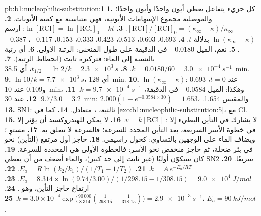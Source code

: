 \begin{solution}{pb:b1:nucleophilic-substitution:1}
\textbf{1.} كل جزيء يتفاعل يعطي أيون  واحدًا وأيون  واحدًا؛
والموصلية مجموع الإسهامات الأيونية، فهي متناسبة مع
كمية الأيونات.
\textbf{2.} $[\mathrm{RCl}]/[\mathrm{RCl}]_0 = (\kappa_\infty -
\kappa)/\kappa_\infty$.
\textbf{3.} $\ln[\mathrm{RCl}] = \ln[\mathrm{RCl}]_0 - kt$: ارسم
$\ln(\kappa_\infty - \kappa)$ بدلالة $t$.
\textbf{4.} 0.693، 0.603، 0.513، 0.423، 0.333، 0.153، $-0.117$، $-0.387$.
\textbf{5.} نعم، الميل $-0.0180$ في الدقيقة على طول المنحنى: الرتبة الأولى.
\textbf{6.} أي رتبة بالنسبة إلى الماء: فتركيزه ثابت
(انحطاط الرتبة).
\textbf{7.} $k = 0.0180/60 = \qty{3.0e-4}{s^{-1}}$.
\textbf{8.} $t_{1/2} = \ln 2/k = \qty{2.3e3}{s}$، أي \qty{38.5}{min}.
\textbf{9.} $\ln 10/k = \qty{7.7e3}{s}$، أي \qty{128}{min}.
\textbf{10.} $\ln(\kappa_\infty - \kappa)$: 0.693 عند $t = 0$، و0.109 عند
\qty{10}{min}، وهكذا: الميل $-0.0584$ في الدقيقة، $k = \qty{9.7e-4}{s^{-1}}$.
\textbf{11.} $9.7/3.0 = 3.2$.
\textbf{12.} عند \qty{30}{min}: $2.000(1 - e^{-0.0584 \times 30}) = 1.653$،
والمقيس 1.654.
\textbf{13.} SN1:  ثالثية، ،  متعادل.
\textbf{14.} كما في \cref{exo:b1:nucleophilic-substitution:5}، مع Cl.
\textbf{15.} لا يشارك في التأين البطيء إلا : $v =
k[\mathrm{RCl}]$.
\textbf{16.} لا يمكن للهيدروكسيد أن يؤثر إلا في خطوة الأسر السريعة، بعد
التأين المحدد للسرعة؛ فالسرعة لا تتعلق به.
\textbf{17.}  مستوٍ ؛ ويضاف الماء على الوجهين
بالتساوي: كحول راسيمي.
\textbf{18.} حاجز أول مرتفع (التأين) نحو  في
بئر ضحلة، ثم حاجز منخفض نحو الأسر: فالخطوة الأولى هي
المحددة للسرعة.
\textbf{19.} كان سيكوّن  أوليًا (غير ثابت إلى حد كبير)، والماء
 أضعف من أن يعطي SN2 سريعًا.
\textbf{20.} $k = A\,e^{-E_a/RT}$.
\textbf{21.} $E_a = R\ln(k_2/k_1)/(1/T_1 - 1/T_2)$.
\textbf{22.} $E_a = 8.314 \times \ln(9.74/3.00)/(1/298.15 - 1/308.15) =
\qty{9.0e4}{J/mol}$.
\textbf{23.} ارتفاع حاجز التأين، وهو .
\textbf{24.} $k = 3.0 \times 10^{-4} \exp\bigl(\frac{90\,000}{8.314}
(\frac{1}{298.15} - \frac{1}{318.15})\bigr) = \qty{2.9e-3}{s^{-1}}$.
\textbf{25.} \textbf{$E_a = \qty{90}{kJ/mol}$}.
\end{solution}
